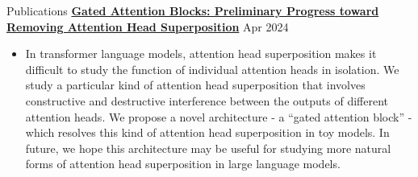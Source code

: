 \documentclass[hidelinks]{resume} %
\begin{document}
\begin{rSection}{Publications}
\href{https://www.lesswrong.com/posts/kzc3qNMsP2xJcxhGn/gated-attention-blocks-preliminary-progress-toward-removing-1}{\textbf{Gated Attention Blocks: Preliminary Progress toward Removing Attention Head Superposition}}
\hfill{Apr 2024}
\begin{itemize}
    \item In transformer language models, attention head superposition makes it difficult to study the function of individual attention heads in isolation. We study a particular kind of attention head superposition that involves constructive and destructive interference between the outputs of different attention heads. We propose a novel architecture - a ``gated attention block'' - which resolves this kind of attention head superposition in toy models. In future, we hope this architecture may be useful for studying more natural forms of attention head superposition in large language models.
\end{itemize}



\end{rSection}
\end{document}
